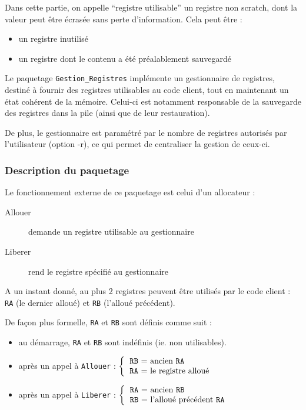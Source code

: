 Dans cette partie, on appelle ``registre utilisable'' un registre non scratch, dont la valeur peut être écrasée sans perte d'information. Cela peut être :
\begin{itemize}
\item un registre inutilisé
\item un registre dont le contenu a été préalablement sauvegardé
\end{itemize}

Le paquetage \verb!Gestion_Registres! implémente un gestionnaire de registres, destiné à fournir des registres utilisables au code client, tout en maintenant un état cohérent de la mémoire. Celui-ci est notamment responsable de la sauvegarde des registres dans la pile (ainsi que de leur restauration).

De plus, le gestionnaire est paramétré par le nombre de registres autorisés par l'utilisateur (option -r), ce qui permet de centraliser la gestion de ceux-ci.

\subsubsection{Description du paquetage}
\label{def_reg}

Le fonctionnement externe de ce paquetage est celui d'un allocateur :
\begin{description}
\item[Allouer] demande un registre utilisable au gestionnaire
\item[Liberer] rend le registre spécifié au gestionnaire
\end{description}

A un instant donné, au plus 2 registres peuvent être utilisés par le code client : \verb!RA! (le dernier alloué) et \verb!RB! (l'alloué précédent).

De façon plus formelle, \verb!RA! et \verb!RB! sont définis comme suit :
\begin{itemize}
\item au démarrage, \verb!RA! et \verb!RB! sont indéfinis (ie. non utilisables).
\item après un appel à \verb!Allouer! :
  $\displaystyle\left\{\begin{tabular}{l}
  \verb!RB! = ancien \verb!RA! \\
  \verb!RA! = le registre alloué
\end{tabular}\right.$
\item après un appel à \verb!Liberer! :
  $\displaystyle\left\{\begin{tabular}{l}
  \verb!RA! = ancien \verb!RB! \\
  \verb!RB! = l'alloué précédent \verb!RA!
\end{tabular}\right.$

\end{itemize}



